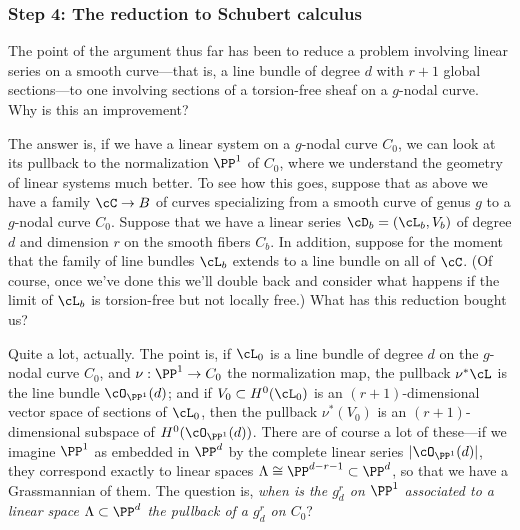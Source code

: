 %


\subsubsection{Step 4: The reduction to Schubert calculus}

The point of the argument thus far has been to reduce a problem involving linear series on a smooth curve---that is, a line bundle of degree $d$ with $r+1$ global sections---to one involving sections of a torsion-free sheaf on a $g$-nodal curve. Why is this an improvement? 

The answer is, if we have a linear system on a $g$-nodal curve $C_0$, we can look at its pullback to the normalization $\PP^1$ of $C_0$, where we understand the geometry of linear systems much better. To see how this goes, suppose that as above we have a family $\cC \to B$ of curves specializing from a smooth curve of genus $g$ to a $g$-nodal curve $C_0$. Suppose  that we have a linear series $\cD_b = (\cL_b, V_b)$ of degree $d$ and dimension $r$ on the smooth fibers $C_b$. In addition, suppose for the moment that the family of line bundles $\cL_b$ extends to a line bundle on all of $\cC$. (Of course, once we've done this we'll double back and consider what happens if the limit of $\cL_b$ is torsion-free but not locally free.) What has this reduction bought us?

Quite a lot, actually. The point is, if $\cL_0$ is a line bundle of degree $d$ on the $g$-nodal curve $C_0$, and $\nu : \PP^1 \to C_0$ the normalization map, the pullback $\nu^*\cL$ is the line bundle $\cO_{\PP^1}(d)$; and if $V_0 \subset H^0(\cL_0)$ is an $(r+1)$-dimensional vector space of sections of $\cL_0$, then the pullback $\nu^*(V_0)$ is  an $(r+1)$-dimensional subspace of $H^0(\cO_{\PP^1}(d))$. There are of course a lot of these---if we imagine $\PP^1$ as embedded in $\PP^d$ by the complete linear series $|\cO_{\PP^1}(d)|$, they correspond exactly to linear spaces $\Lambda \cong \PP^{d-r-1} \subset \PP^d$, so that we have a Grassmannian of them. The question is, \emph{when is the $g^r_d$ on $\PP^1$ associated to a linear space $\Lambda \subset \PP^d$ the pullback of a $g^r_d$ on $C_0$}?

